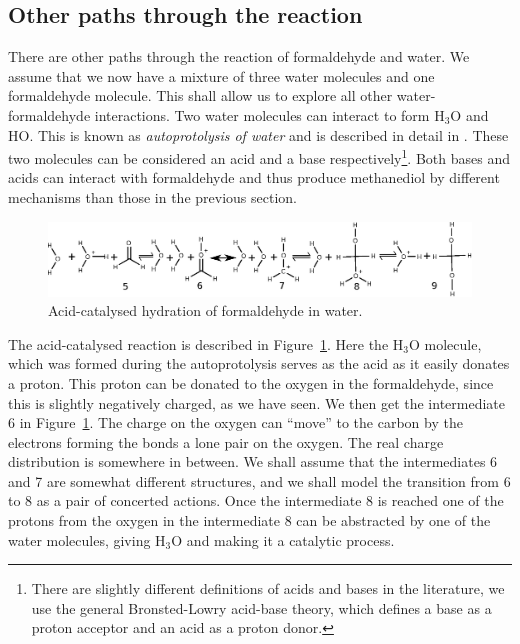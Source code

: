 \subsection{Other paths through the reaction}
\label{sec:otherpaths}

There are other paths through the reaction of formaldehyde and water.
We assume that we now have a mixture of three water molecules and one formaldehyde molecule. 
This shall allow us to explore all other water-formaldehyde interactions. Two water molecules can interact 
to form $\mathrm{H_3O}$ and $\mathrm{HO}$. This is known as \emph{autoprotolysis of water} and is
described in detail in \cite{merevcomp2015}. These two molecules can be considered an acid and a base
respectively\footnote{There are slightly different definitions of acids and bases in the literature,
we use the general Bronsted-Lowry acid-base theory, which defines a base as a proton acceptor and 
an acid as a proton donor.}. Both bases and acids can interact with formaldehyde 
and thus produce methanediol by different mechanisms than those in the previous section.

\begin{figure}[h!]
  \centering
    \includegraphics[width=1.0\textwidth]{formaldehyde_acid}
  \caption{Acid-catalysed hydration of formaldehyde in water.}
  \label{fig:acidcat}
\end{figure}

The acid-catalysed reaction is described in Figure~\ref{fig:acidcat}. Here the $\mathrm{H_3O}$ molecule,
which was formed during the autoprotolysis serves as the acid as it easily donates a proton. 
This proton can be donated to the oxygen in the formaldehyde, since this is slightly negatively charged, 
as we have seen. We then get the intermediate 6 in Figure~\ref{fig:acidcat}. The charge on the oxygen 
can ``move'' to the carbon by the electrons forming the bonds a lone pair on the oxygen. 
The real charge distribution is somewhere in between. We shall assume that the intermediates 6 and 7 
are somewhat  different structures, and we shall model the transition from 6 to 8 as a pair of 
concerted actions. Once the intermediate 8 is reached one of the protons from the oxygen in the
intermediate 8 can be abstracted by one of the water molecules, giving $\mathrm{H_3O}$ and
making it a catalytic process.

